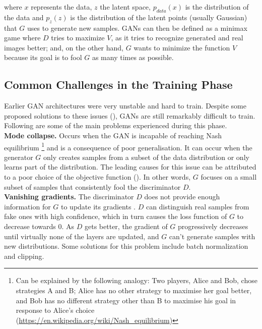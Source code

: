  \noindent where $x$ represents the data, $z$ the latent space,  $p_{data}(x)$ is the distribution of the data and $p_z(z)$ is the distribution of the latent points (usually Gaussian) that $G$ uses to generate new samples. GANs can then be defined as a minimax game where $D$ tries to maximize $V$, as it tries to recognize generated and real images better; and, on the other hand, $G$ wants to minimize the function $V$ because its goal is to fool $G$ as many times as possible. 


\subsection{Common Challenges in the Training Phase}
Earlier GAN architectures were very unstable and hard to train. Despite some proposed solutions to these issues (\cite{radford.etal_UnsupervisedRepresentationLearning_2016,arjovsky.etal_WassersteinGenerativeAdversarial_}), GANs are still remarkably difficult to train. Following are some of the main problems experienced during this phase.\\

\noindent\textbf{Mode collapse.} Occurs when the GAN is incapable of reaching Nash equilibrium \footnote{Can be explained by the following analogy: Two players, Alice and Bob, chose strategies A and B; Alice has no other strategy to maximise her goal better, and Bob has no different strategy other than B to maximise his goal in response to Alice's choice (\url{https://en.wikipedia.org/wiki/Nash_equilibrium})} and is a consequence of poor generalisation. It can occur when the generator $G$ only creates samples from a subset of the data distribution or only learns part of the distribution. The leading causes for this issue can be attributed to a poor choice of the objective function (\cite{saxena.cao_GenerativeAdversarialNetworks_2022}). In other words, $G$ focuses on a small subset of samples that consistently fool the discriminator $D$.\\

\noindent\textbf{Vanishing gradients.} The discriminator $D$ does not provide enough information for $G$ to update its gradients \cite{little.etal_GenerativeAdversarialNetworks_2021}. $D$ can distinguish real samples from fake ones with high confidence, which in turn causes the loss function of $G$ to decrease towards 0. As $D$ gets better, the gradient of $G$ progressively decreases until virtually none of the layers are updated, and $G$ can't generate samples with new distributions. Some solutions for this problem include batch normalization and clipping.\\

